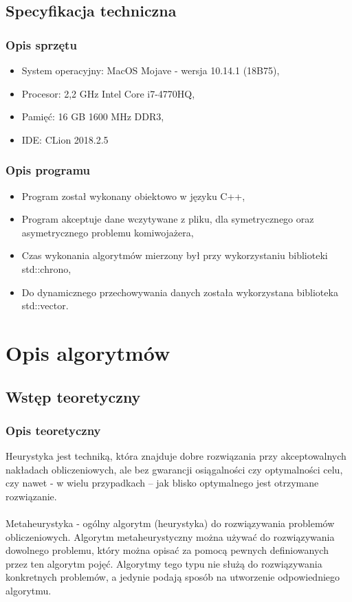 \documentclass[12pt,a4paper,titlepage]{article}
\begin{document}
\subsection{Specyfikacja techniczna}
\subsubsection{Opis sprzętu}
\begin{itemize}
    \item System operacyjny: MacOS Mojave - wersja 10.14.1 (18B75),
    \item Procesor: 2,2 GHz Intel Core i7-4770HQ,
    \item Pamięć: 16 GB 1600 MHz DDR3,
    \item IDE: CLion 2018.2.5
\end{itemize}
\subsubsection{Opis programu}
\begin{itemize}
    \item Program został wykonany obiektowo w języku C++,
    \item Program akceptuje dane wczytywane z pliku, dla symetrycznego oraz asymetrycznego problemu komiwojażera,
    \item Czas wykonania algorytmów mierzony był przy wykorzystaniu biblioteki std::chrono,
    \item Do dynamicznego przechowywania danych została wykorzystana biblioteka std::vector.
\end{itemize}

\section{Opis algorytmów}
\subsection{Wstęp teoretyczny}
\subsubsection{Opis teoretyczny}
Heurystyka jest techniką, która znajduje dobre rozwiązania przy akceptowalnych nakładach obliczeniowych, ale bez gwarancji osiągalności czy optymalności celu, czy nawet - w  wielu przypadkach – jak blisko optymalnego jest otrzymane rozwiązanie.\cite{agh}
\\\\
Metaheurystyka - ogólny algorytm (heurystyka) do rozwiązywania problemów obliczeniowych. Algorytm metaheurystyczny można używać do rozwiązywania dowolnego problemu, który można opisać za pomocą pewnych definiowanych przez ten algorytm pojęć. Algorytmy tego typu nie służą do rozwiązywania konkretnych problemów, a jedynie podają sposób na utworzenie odpowiedniego algorytmu.\cite{agh}
\end{document}
